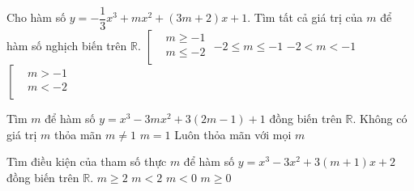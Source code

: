 \begin{ex}%
	Cho hàm số $ y=-\dfrac{1}{3}{x^3}+m{x^2}+\left(3m+2\right)x+1$. Tìm tất cả giá trị của $ m$ để hàm số nghịch biến trên $\mathbb{R}$.
	\choice
	{$\left[\begin{aligned}
			& m\ge-1\\ 
			& m\le-2\\ 
		\end{aligned}\right.$}
	{\True $-2\le m\le-1$}
	{$-2<m<-1$}
	{$\left[\begin{aligned}
			& m>-1\\ 
			& m<-2\\ 
		\end{aligned}\right.$}
\end{ex}
\begin{ex}%
	Tìm $ m$ để hàm số $ y=x^3-3m{x^2}+3\left(2m-1\right)+1$ đồng biến trên $\mathbb{R}$.
	\choice
	{Không có giá trị $ m$ thỏa mãn}
	{$ m\ne 1$}
	{\True $ m=1$}
	{Luôn thỏa mãn với mọi $ m$}
\end{ex}
\begin{ex}%
	Tìm điều kiện của tham số thực $ m$ để hàm số $ y=x^3-3x^2+3\left(m+1\right)x+2$ đồng biến trên $\mathbb{R}$.
	\choice
	{$ m\ge 2$}
	{$ m<2$}
	{$ m<0$}
	{\True $ m\ge 0$}
\end{ex}

